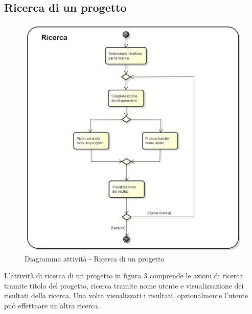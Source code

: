\subsection{Ricerca di un progetto}
\begin{figure}[h] 
	\centering 
	\includegraphics[scale=0.3] {img/Activity_ricerca.png} 
	\caption{Diagramma attività - Ricerca di un progetto} 
\end{figure}
L'attività di ricerca di un progetto in figura 3 comprende le azioni di ricerca tramite titolo del progetto, ricerca tramite nome utente e visualizzazione dei risultati della ricerca. Una volta visualizzati i risultati, opzionalmente l'utente può effettuare un'altra ricerca.
\newpage

